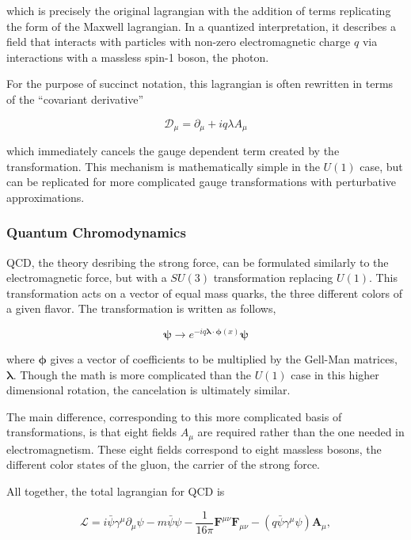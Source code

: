 which is precisely the original lagrangian with the addition of terms replicating the form of the Maxwell lagrangian. In a quantized interpretation, it describes a field that interacts with particles with non-zero electromagnetic charge $q$ via interactions with a massless spin-1 boson, the photon. 

For the purpose of succinct notation, this lagrangian is often rewritten in terms of the ``covariant derivative''

\begin{equation}
\mathcal{D}_\mu = \partial_\mu + iq\lambda A_\mu
\end{equation}

which immediately cancels the gauge dependent term created by the transformation. This mechanism is mathematically simple in the $U(1)$ case, but can be replicated for more complicated gauge transformations with perturbative approximations. 

\subsubsection{Quantum Chromodynamics}
\label{sec:strong}

\ac{QCD}, the theory desribing the strong force, can be formulated similarly to the electromagnetic force, but with a $SU(3)$ transformation replacing $U(1)$. This transformation acts on a vector of equal mass quarks, the three different colors of a given flavor. The transformation is written as follows,

\begin{equation}
\bm{\psi} \rightarrow e^{-iq\bm{\lambda}\cdot\bm{\phi}(x)}\bm{\psi}
\end{equation}

where $\bm{\phi}$ gives a vector of coefficients to be multiplied by the Gell-Man matrices, $\bm{\lambda}$. Though the math is more complicated than the $U(1)$ case in this higher dimensional rotation, the cancelation is ultimately similar. 

The main difference, corresponding to this more complicated basis of transformations, is that eight fields $A_\mu$ are required rather than the one needed in electromagnetism. These eight fields correspond to eight massless bosons, the different color states of the gluon, the carrier of the strong force.  

All together, the total lagrangian for \ac{QCD} is

\begin{equation}
\mathcal{L} = i\bar{\psi}\gamma^\mu \partial_\mu\psi - m \bar{\psi}\psi -\frac{1}{16\pi}\bm{F}^{\mu\nu}\bm{F}_{\mu\nu} - (q\bar{\psi}\gamma^\mu\psi)\bm{A}_\mu , 
\end{equation}

